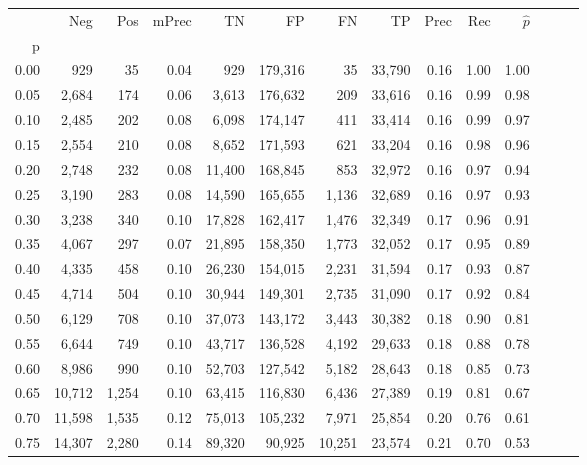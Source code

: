 \begin{tabular}{rrrrrrrrrrrrrr}
\toprule
{} &     Neg &    Pos & mPrec &       TN &       FP &      FN &      TP &  Prec &   Rec & $\hat{p}$ \\
p    &         &        &       &          &          &         &         &       &       &           \\
\midrule
0.00 &     929 &     35 &  0.04 &      929 &  179,316 &      35 &  33,790 &  0.16 &  1.00 &      1.00 \\
0.05 &   2,684 &    174 &  0.06 &    3,613 &  176,632 &     209 &  33,616 &  0.16 &  0.99 &      0.98 \\
0.10 &   2,485 &    202 &  0.08 &    6,098 &  174,147 &     411 &  33,414 &  0.16 &  0.99 &      0.97 \\
0.15 &   2,554 &    210 &  0.08 &    8,652 &  171,593 &     621 &  33,204 &  0.16 &  0.98 &      0.96 \\
0.20 &   2,748 &    232 &  0.08 &   11,400 &  168,845 &     853 &  32,972 &  0.16 &  0.97 &      0.94 \\
0.25 &   3,190 &    283 &  0.08 &   14,590 &  165,655 &   1,136 &  32,689 &  0.16 &  0.97 &      0.93 \\
0.30 &   3,238 &    340 &  0.10 &   17,828 &  162,417 &   1,476 &  32,349 &  0.17 &  0.96 &      0.91 \\
0.35 &   4,067 &    297 &  0.07 &   21,895 &  158,350 &   1,773 &  32,052 &  0.17 &  0.95 &      0.89 \\
0.40 &   4,335 &    458 &  0.10 &   26,230 &  154,015 &   2,231 &  31,594 &  0.17 &  0.93 &      0.87 \\
0.45 &   4,714 &    504 &  0.10 &   30,944 &  149,301 &   2,735 &  31,090 &  0.17 &  0.92 &      0.84 \\
0.50 &   6,129 &    708 &  0.10 &   37,073 &  143,172 &   3,443 &  30,382 &  0.18 &  0.90 &      0.81 \\
0.55 &   6,644 &    749 &  0.10 &   43,717 &  136,528 &   4,192 &  29,633 &  0.18 &  0.88 &      0.78 \\
0.60 &   8,986 &    990 &  0.10 &   52,703 &  127,542 &   5,182 &  28,643 &  0.18 &  0.85 &      0.73 \\
0.65 &  10,712 &  1,254 &  0.10 &   63,415 &  116,830 &   6,436 &  27,389 &  0.19 &  0.81 &      0.67 \\
0.70 &  11,598 &  1,535 &  0.12 &   75,013 &  105,232 &   7,971 &  25,854 &  0.20 &  0.76 &      0.61 \\
0.75 &  14,307 &  2,280 &  0.14 &   89,320 &   90,925 &  10,251 &  23,574 &  0.21 &  0.70 &      0.53 \\

\end{tabular}
